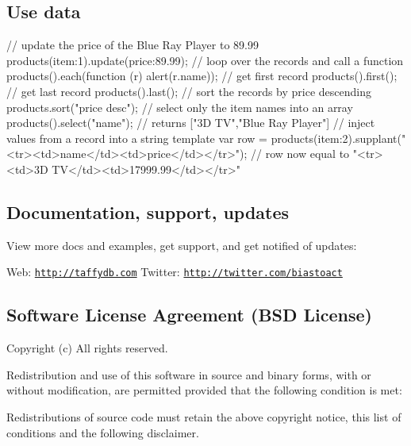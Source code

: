 \subsection*{Use data}

\begin{DoxyVerb}// update the price of the Blue Ray Player to 89.99
products({item:1}).update({price:89.99});
// loop over the records and call a function
products().each(function (r) {alert(r.name)});
// get first record
products().first();
// get last record
products().last();
// sort the records by price descending
products.sort("price desc");
// select only the item names into an array
products().select("name"); // returns ["3D TV","Blue Ray Player"]
// inject values from a record into a string template
var row = products({item:2}).supplant("<tr><td>{name}</td><td>{price}</td></tr>");
// row now equal to "<tr><td>3D TV</td><td>17999.99</td></tr>"
\end{DoxyVerb}


\subsection*{Documentation, support, updates}

View more docs and examples, get support, and get notified of updates\+:

Web\+: \href{http://taffydb.com}{\tt http\+://taffydb.\+com} Twitter\+: \href{http://twitter.com/biastoact}{\tt http\+://twitter.\+com/biastoact}

\subsection*{Software License Agreement (B\+SD License)}

Copyright (c) All rights reserved.

Redistribution and use of this software in source and binary forms, with or without modification, are permitted provided that the following condition is met\+:


\begin{DoxyItemize}
\item Redistributions of source code must retain the above copyright notice, this list of conditions and the following disclaimer.
\end{DoxyItemize}

